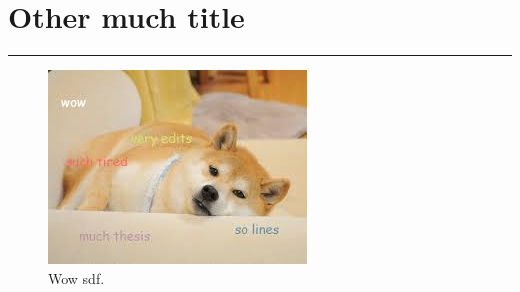
\chapter{Other much title}\label{capit:cap5}
\vspace{-2.0325ex}%
\noindent
\rule{\textwidth}{0.5pt}
\vspace{-5.5ex}%
\newcommand{\pushline}{\Indp}%


\begin{figure}[!hbp]
\begin{center}
\includegraphics[scale=1.5]
{./Figures/doge.jpeg}
\end{center}
\caption{Wow sdf.}
\label{doge}
\end{figure}


\newpage
